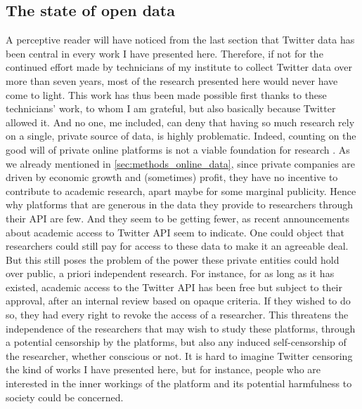 \documentclass[../thesis.tex]{subfiles}
\begin{document}
\subsection{The state of open data}
A perceptive reader will have noticed from the last section that Twitter data has been
central in every work I have presented here. Therefore, if not for the continued effort
made by technicians of my institute to collect Twitter data over more than seven years,
most of the research presented here would never have come to light. This work has thus
been made possible first thanks to these technicians' work, to whom I am grateful, but
also basically because Twitter allowed it. And no one, me included, can deny that
having so much research rely on a single, private source of data, is highly problematic.
Indeed, counting on the good will of private online platforms is not a viable foundation
for research \cite{AusloosOperationalizingResearch2020}. As we already mentioned in
\cref{sec:methods_online_data}, since private companies are driven by economic growth
and (sometimes) profit, they have no incentive to contribute to academic research, apart
maybe for some marginal publicity. Hence why platforms that are generous in the data
they provide to researchers through their \ac{API} are few. And they seem to be getting
fewer, as recent announcements about academic access to Twitter \ac{API} seem to
indicate. One could object that researchers could still pay for access to these data to
make it an agreeable deal. But this still poses the problem of the power these private
entities could hold over public, a priori independent research. For instance, for as
long as it has existed, academic access to the Twitter \ac{API} has been free but
subject to their approval, after an internal review based on opaque criteria. If they
wished to do so, they had every right to revoke the access of a researcher. This
threatens the independence of the researchers that may wish to study these platforms,
through a potential censorship by the platforms, but also any induced self-censorship of
the researcher, whether conscious or not. It is hard to imagine Twitter censoring the
kind of works I have presented here, but for instance, people who are interested in the
inner workings of the platform and its potential harmfulness to society could be
concerned.
\end{document}
